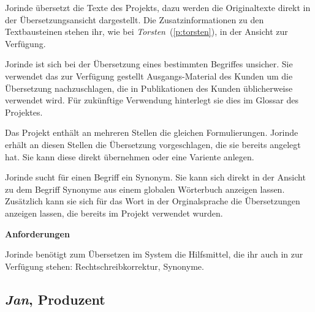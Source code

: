\begin{multicols}{2}
Jorinde übersetzt die Texte des Projekts, dazu werden die Originaltexte direkt in der Übersetzungsansicht dargestellt. Die Zusatzinformationen zu den Textbausteinen stehen ihr, wie bei \emph{Torsten}~(\ref{p:torsten}), in der Ansicht zur Verfügung.

Jorinde ist sich bei der Übersetzung eines bestimmten Begriffes unsicher. Sie verwendet das zur Verfügung gestellt Ausgangs-Material des Kunden um die Übersetzung nachzuschlagen, die in Publikationen des Kunden üblicherweise verwendet wird. Für zukünftige Verwendung hinterlegt sie dies im Glossar des Projektes.

Das Projekt enthält an mehreren Stellen die gleichen Formulierungen. Jorinde erhält an diesen Stellen die Übersetzung vorgeschlagen, die sie bereits angelegt hat. Sie kann diese direkt übernehmen oder eine Variente anlegen.

Jorinde sucht für einen Begriff ein Synonym. Sie kann sich direkt in der Ansicht zu dem Begriff Synonyme aus einem globalen Wörterbuch anzeigen lassen. Zusätzlich kann sie sich für das Wort in der Orginalsprache die Übersetzungen anzeigen lassen, die bereits im Projekt verwendet wurden.

\textbf{Anforderungen}

Jorinde benötigt zum Übersetzen im System die Hilfsmittel, die ihr auch in  zur Verfügung stehen: Rechtschreibkorrektur, Synonyme.

\end{multicols}

\pagebreak

\subsection{\emph{Jan}, Produzent}\label{p:jan}

